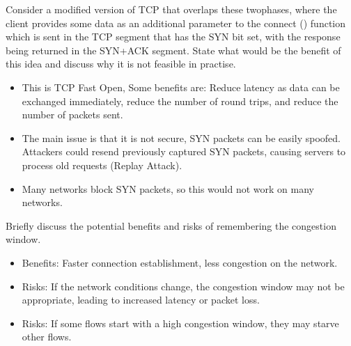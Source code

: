 \documentclass{article}
\begin{document}
\noindent Consider a modified version of TCP that overlaps these twophases, where the client provides some data as an additional parameter to the connect ()
function which is sent in the TCP segment that has the SYN bit set, with the response being
returned in the SYN+ACK segment. State what would be the benefit of this idea and discuss
why it is not feasible in practise.
\begin{itemize}
    \item This is TCP Fast Open, Some benefits are: Reduce latency as data can be exchanged immediately, reduce the number of round trips, and reduce the number of packets sent.
    \item The main issue is that it is not secure, SYN packets can be easily spoofed. Attackers could resend previously captured SYN packets, causing servers to process old requests (Replay Attack).
    \item Many networks block SYN packets, so this would not work on many networks.
\end{itemize}

Briefly discuss the potential benefits and risks of remembering the congestion window.
\begin{itemize}
    \item Benefits: Faster connection establishment, less congestion on the network.
    \item Risks: If the network conditions change, the congestion window may not be appropriate, leading to increased latency or packet loss. 
    \item Risks: If some flows start with a high congestion window, they may starve other flows.
\end{itemize}
\end{document}
